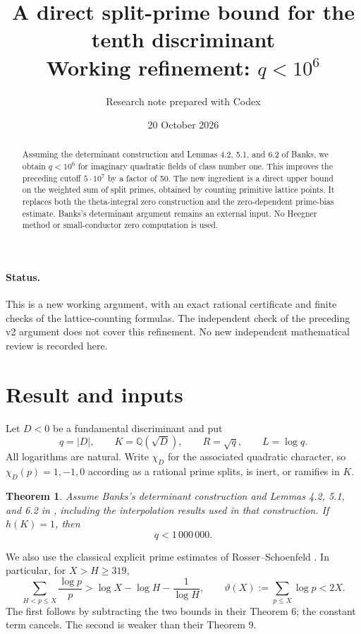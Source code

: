 \documentclass[11pt]{article}
\title{A direct split-prime bound for the tenth discriminant\\
\large Working refinement: \(q<10^6\)}
\author{Research note prepared with Codex}
\date{20 October 2026}
\newtheorem{theorem}{Theorem}
\newcommand{\Q}{\mathbb Q}
\begin{document}
\maketitle
\begin{abstract}
Assuming the determinant construction and Lemmas 4.2, 5.1, and 6.2 of
Banks, we obtain \(q<10^6\) for imaginary quadratic fields of class
number one. This improves the preceding cutoff \(5\cdot10^7\) by a
factor of 50. The new ingredient is a direct upper bound on the weighted
sum of split primes, obtained by counting primitive lattice points.
It replaces both the theta-integral zero construction and the
zero-dependent prime-bias estimate. Banks's determinant argument remains
an external input. No Heegner method or small-conductor zero computation
is used.
\end{abstract}

\paragraph{Status.}
This is a new working argument, with an exact rational certificate and
finite checks of the lattice-counting formulas. The independent check
of the preceding v2 argument does not cover this refinement. No new
independent mathematical review is recorded here.

\section{Result and inputs}

Let \(D<0\) be a fundamental discriminant and put
\[
 q=|D|,\qquad K=\Q(\sqrt D),\qquad R=\sqrt q,\qquad L=\log q.
\]
All logarithms are natural. Write \(\chi_D\) for the associated
quadratic character, so \(\chi_D(p)=1,-1,0\) according as a rational
prime splits, is inert, or ramifies in \(K\).

\begin{theorem}\label{main}
Assume Banks's determinant construction and Lemmas 4.2, 5.1, and 6.2
in \cite{banks}, including the interpolation results used in that
construction. If \(h(K)=1\), then
\[
                         q<1\,000\,000.
\]
\end{theorem}

We also use the classical explicit prime estimates of
Rosser--Schoenfeld \cite[Theorems 6 and 9]{rs}. In particular, for
\(X>H\ge319\),
\begin{equation}\label{mertens}
 \sum_{H<p\le X}\frac{\log p}{p}
 >\log X-\log H-\frac1{\log H},
 \qquad
 \vartheta(X):=\sum_{p\le X}\log p<2X.
\end{equation}
The first follows by subtracting the two bounds in their Theorem 6;
the constant term cancels. The second is weaker than their Theorem 9.
\end{document}
